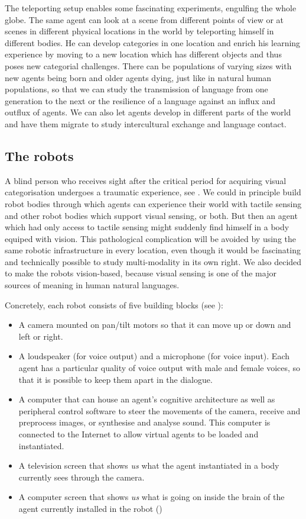 The teleporting setup enables some fascinating 
experiments, engulfing the 
whole globe. The same agent can look at a scene from
different points of view or at scenes in different
physical locations in the world by teleporting himself in different 
bodies. He can develop categories in one location
and enrich his learning experience by moving to a new 
location which has different objects and thus poses new 
categorial challenges.
There can be populations of varying sizes with new 
agents being born and older agents dying, just like in 
natural human populations, so that we can study the 
transmission of language from one generation to the next
or the resilience of a language against an influx and 
outflux of agents. We can also let agents develop in
different parts of the world and have them migrate to
study intercultural exchange and language contact. 

\subsection{The robots}

A blind person who receives sight after the critical 
period for acquiring visual categorisation undergoes a 
traumatic experience, see \cite{Zeki:1993}. 
We could in principle build robot bodies
through which agents can experience their world with tactile
sensing and other robot bodies which support visual sensing, or both. 
But then an agent which had only access to tactile
sensing might suddenly find himself in a body equiped with 
vision. This pathological complication will 
be avoided by using the same robotic infrastructure
in every location, even though it would be fascinating and 
technically possible to study multi-modality in its 
own right. 
We also decided to make the robots vision-based, because visual 
sensing is one of the major sources of meaning in
human natural languages. 

Concretely, each robot consists of five building blocks (see ):
\begin{itemize}
\item A camera mounted on pan/tilt motors so that it can move 
up or down and left or right. 
\item A loudspeaker (for voice output) and a microphone (for 
voice input). Each agent has a particular quality of voice
output with male and female voices, so that it is possible 
to keep them apart in the dialogue. 
\item A computer that can house an agent's 
cognitive architecture as well as peripheral 
control software to steer the movements of the camera, 
receive and preprocess images, or synthesise and analyse 
sound. This computer is connected 
to the Internet to allow virtual agents to be loaded and instantiated. 
\item A television screen that shows {\itshape us} what the agent
instantiated in a body currently sees through the camera. 
\item A computer screen that shows {\itshape us} what is going on inside
the brain of the agent currently installed in the robot ()
\end{itemize}


